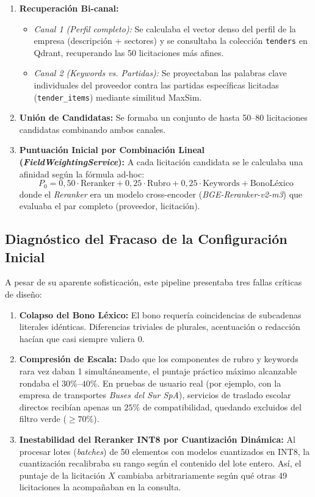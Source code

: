 \documentclass[11pt,a4paper]{article}
\begin{document}
\begin{enumerate}[leftmargin=*]
    \item \textbf{Recuperación Bi-canal:}
    \begin{itemize}
        \item \textit{Canal 1 (Perfil completo):} Se calculaba el vector denso del perfil de la empresa (descripción + sectores) y se consultaba la colección \texttt{tenders} en Qdrant, recuperando las 50 licitaciones más afines.
        \item \textit{Canal 2 (Keywords vs. Partidas):} Se proyectaban las palabras clave individuales del proveedor contra las partidas específicas licitadas (\texttt{tender\_items}) mediante similitud MaxSim.
    \end{itemize}
    \item \textbf{Unión de Candidatas:} Se formaba un conjunto de hasta 50--80 licitaciones candidatas combinando ambos canales.
    \item \textbf{Puntuación Inicial por Combinación Lineal (\textit{FieldWeightingService}):}
    A cada licitación candidata se le calculaba una afinidad según la fórmula ad-hoc:
    \begin{equation}
        P_0 = 0{,}50 \cdot \text{Reranker} + 0{,}25 \cdot \text{Rubro} + 0{,}25 \cdot \text{Keywords} + \text{BonoLéxico}
    \end{equation}
    donde el \textit{Reranker} era un modelo cross-encoder (\textit{BGE-Reranker-v2-m3}) que evaluaba el par completo (proveedor, licitación).
\end{enumerate}

\subsection{Diagnóstico del Fracaso de la Configuración Inicial}
A pesar de su aparente sofisticación, este pipeline presentaba tres fallas críticas de diseño:

\begin{enumerate}[leftmargin=*]
    \item \textbf{Colapso del Bono Léxico:} El bono requería coincidencias de subcadenas literales idénticas. Diferencias triviales de plurales, acentuación o redacción hacían que casi siempre valiera 0.
    \item \textbf{Compresión de Escala:} Dado que los componentes de rubro y keywords rara vez daban 1 simultáneamente, el puntaje práctico máximo alcanzable rondaba el $30\%$--$40\%$. En pruebas de usuario real (por ejemplo, con la empresa de transportes \textit{Buses del Sur SpA}), servicios de traslado escolar directos recibían apenas un $25\%$ de compatibilidad, quedando excluidos del filtro verde ($\ge 70\%$).
    \item \textbf{Inestabilidad del Reranker INT8 por Cuantización Dinámica:} Al procesar lotes (\textit{batches}) de 50 elementos con modelos cuantizados en INT8, la cuantización recalibraba su rango según el contenido del lote entero. Así, el puntaje de la licitación $X$ cambiaba arbitrariamente según qué otras 49 licitaciones la acompañaban en la consulta.
\end{enumerate}
\end{document}
